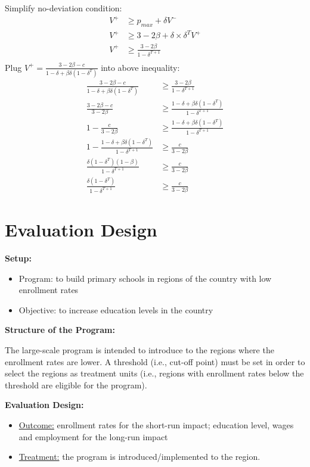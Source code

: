 \documentclass[a4paper, 11pt]{article}
\begin{document}
Simplify no-deviation condition:
\begin{align*}
    V^{+}&\geq p_{max} + \delta V^{-} \\
    V^{+}&\geq 3-2\beta + \delta\times\delta^{T}V^{+} \\
    V^{+}&\geq\frac{3-2\beta}{1-\delta^{T+1}} \\
\end{align*}
Plug $V^{+}=\frac{3-2\beta-c}{1-\delta+\beta\delta(1-\delta^T)}$ into above inequality:
\begin{align*}
    \frac{3-2\beta-c}{1-\delta+\beta\delta(1-\delta^T)}&\geq\frac{3-2\beta}{1-\delta^{T+1}} \\
    \frac{3-2\beta-c}{3-2\beta}&\geq\frac{1-\delta+\beta\delta(1-\delta^T)}{1-\delta^{T+1}} \\
    1-\frac{c}{3-2\beta}&\geq\frac{1-\delta+\beta\delta(1-\delta^T)}{1-\delta^{T+1}} \\
    1-\frac{1-\delta+\beta\delta(1-\delta^T)}{1-\delta^{T+1}}&\geq\frac{c}{3-2\beta} \\
    \frac{\delta(1-\delta^T)(1-\beta)}{1-\delta^{T+1}}&\geq\frac{c}{3-2\beta} \\
    \frac{\delta(1-\delta^T)}{1-\delta^{T+1}}&\geq\frac{c}{3-2\beta}
\end{align*}

\newpage
\section{Evaluation Design}

\textbf{Setup:}
\begin{itemize}
    \item Program: to build primary schools in regions of the country with low enrollment rates
    \item Objective: to increase education levels in the country
\end{itemize}


\textbf{Structure of the Program:}

The large-scale program is intended to introduce to the regions where the enrollment rates are lower. A threshold (i.e., cut-off point) must be set in order to select the regions as treatment units (i.e., regions with enrollment rates below the threshold are eligible for the program). 

\textbf{Evaluation Design:}
\begin{itemize}
    \item \underline{Outcome:} enrollment rates for the short-run impact; education level, wages and employment for the long-run impact
    \item \underline{Treatment:} the program is introduced/implemented to the region.
\end{itemize}
\end{document}
